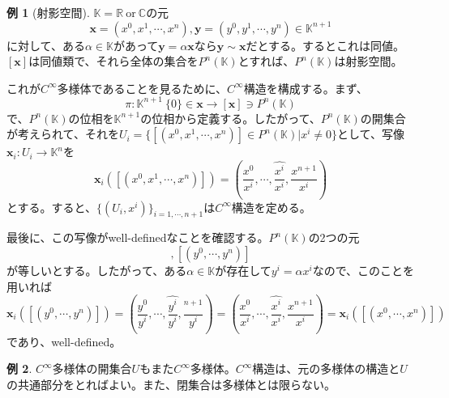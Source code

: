 \documentclass[unicode,a4paper,11pt]{ltjsarticle}
\theoremstyle{definition}
\newtheorem{exm}{例}[section]
\begin{document}
\begin{exm}[射影空間]
  $\mathbb{K}=\mathbb{R}\ \mathrm{or}\ \mathbb{C}$の元
  \begin{equation}
    \bm{x}=(x^{0},x^{1},\cdots,x^{n}),
    \bm{y}=(y^{0},y^{1},\cdots,y^{n})
    \in
    \mathbb{K}^{n+1}
  \end{equation}
  に対して、ある$\alpha\in\mathbb{K}$があって$\bm{y}=\alpha\bm{x}$なら$\bm{y}\sim\bm{x}$だとする。するとこれは同値。$[\bm{x}]$は同値類で、それら全体の集合を$P^{n}(\mathbb{K})$とすれば、$P^{n}(\mathbb{K})$は射影空間。

  これが$C^{\infty}$多様体であることを見るために、$C^{\infty}$構造を構成する。まず、
  \begin{equation}
    \pi
    :
    \mathbb{K}^{n+1}\ \{0\}\in\bm{x}
    \rightarrow
    [\bm{x}]\ni P^{n}(\mathbb{K})
  \end{equation}
  で、$P^{n}(\mathbb{K})$の位相を$\mathbb{K}^{n+1}$の位相から定義する。したがって、$P^{n}(\mathbb{K})$の開集合が考えられて、それを$U_{i}=\{[(x^{0},x^{1},\cdots,x^{n})]\in P^{n}(\mathbb{K})|x^{i}\neq 0\}$として、写像$\bm{x}_{i}:U_{i}\rightarrow\mathbb{K}^{n}$を
  \begin{equation}
    \bm{x}_{i}([(x^{0},x^{1},\cdots,x^{n})])
    =
    \left(
    \frac{x^{0}}{x^{i}}
    ,\cdots,
    \widehat{
      \frac{x^{i}}{x^{i}}
    },\frac{x^{n+1}}{x^{i}}
    \right)
  \end{equation}
  とする。すると、$\{(U_{i},x^{i})\}_{i=1,\cdots,n+1}$は$C^{\infty}$構造を定める。

  最後に、この写像がwell-definedなことを確認する。$P^{n}(\mathbb{K})$の2つの元
  \begin{equation}
    [(x^{0},\cdots,x^{n})]
    ,
    [(y^{0},\cdots,y^{n})]
  \end{equation}
  が等しいとする。したがって、ある$\alpha\in\mathbb{K}$が存在して$y^{i}=\alpha x^{i}$なので、このことを用いれば
  \begin{equation}
    \bm{x}_{i}([(y^{0},\cdots,y^{n})])
    =
    \left(
    \frac{y^{0}}{y^{i}}
    ,\cdots,
    \widehat{
      \frac{y^{i}}{y^{i}}
    },\frac{^{n+1}}{y^{i}}
    \right)
    =
    \left(
    \frac{x^{0}}{x^{i}}
    ,\cdots,
    \widehat{
      \frac{x^{i}}{x^{i}}
    },\frac{x^{n+1}}{x^{i}}
    \right)
    =
    \bm{x}_{i}([(x^{0},\cdots,x^{n})])
  \end{equation}
  であり、well-defined。
\end{exm}

\begin{exm}
  $C^{\infty}$多様体の開集合$U$もまた$C^{\infty}$多様体。$C^{\infty}$構造は、元の多様体の構造と$U$の共通部分をとればよい。また、閉集合は多様体とは限らない。
\end{exm}
\end{document}

